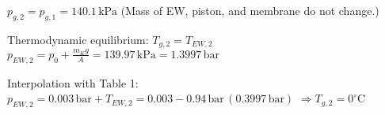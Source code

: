 \( p_{g,2} = p_{g,1} = 140.1 \, \text{kPa} \)  
(Mass of EW, piston, and membrane do not change.)  

Thermodynamic equilibrium: \( T_{g,2} = T_{EW,2} \)  
\( p_{EW,2} = p_0 + \frac{m_K g}{A} = 139.97 \, \text{kPa} = 1.3997 \, \text{bar} \)  

Interpolation with Table 1:  
\( p_{EW,2} = 0.003 \, \text{bar} + T_{EW,2} = 0.003 - 0.94 \, \text{bar} \, (0.3997 \, \text{bar}) \)  
\( \Rightarrow T_{g,2} = 0^\circ \text{C} \)